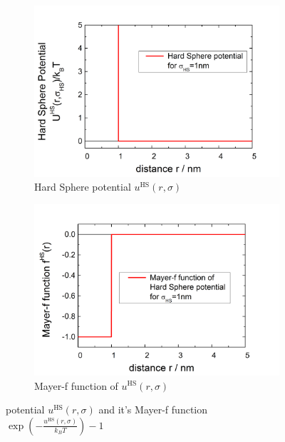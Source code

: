 \begin{figure}[htb]
\centering
\begin{subfigure}[b]{.48\textwidth}
   \centering
   \includegraphics[width=\textwidth]{../images/OZsolver/potentials/potUHS.png}
   \caption{Hard Sphere potential $u^\text{HS}(r,\sigma)$}
   \label{fig:OZUHS}
\end{subfigure}
\hfill
\begin{subfigure}[b]{.48\textwidth}
   \centering
   \includegraphics[width=\textwidth]{../images/OZsolver/potentials/potfHS.png}
   \caption{Mayer-f function of $u^\text{HS}(r,\sigma)$}
   \label{fig:OZMeyerfHS}
\end{subfigure}
\caption{potential $u^\text{HS}(r,\sigma)$ and it's Mayer-f function $\exp\left(-\frac{u^\text{HS}(r,\sigma)}{k_BT}\right)-1$}
\end{figure}

